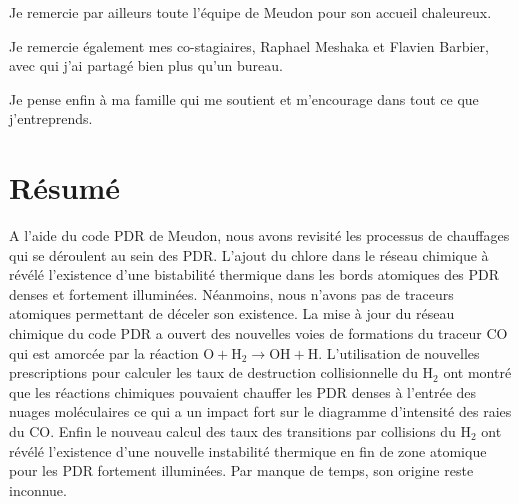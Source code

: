 \documentclass[11pt,a4paper,twoside,openright]{article}
\begin{document}
\begin{spacing}{0.98}
Je remercie par ailleurs toute l’équipe de Meudon pour son accueil chaleureux.\newline

Je remercie également mes co-stagiaires, Raphael Meshaka et Flavien Barbier, avec qui j’ai partagé bien plus qu'un bureau.  \newline

Je pense enfin à ma famille qui me soutient et m’encourage dans tout ce que j’entreprends. 


\newpage 

\clearpage 
\thispagestyle{nofancy}
\section*{Résumé}

A l'aide du code PDR de Meudon, nous avons revisité les processus de chauffages qui se déroulent au sein des PDR. L'ajout du chlore dans le réseau chimique à révélé l'existence d'une bistabilité thermique dans les bords atomiques des PDR denses et fortement illuminées. Néanmoins, nous n'avons pas de traceurs atomiques permettant de déceler son existence. La mise à jour du réseau chimique du code PDR a ouvert des nouvelles voies de formations du traceur $\mathrm{CO}$ qui est amorcée par la réaction  $\mathrm{O} + \mathrm{H}_2 \rightarrow \mathrm{OH} + \mathrm{H}$. L'utilisation de nouvelles prescriptions pour calculer les taux de destruction collisionnelle du $\mathrm{H}_2$ ont montré que les réactions chimiques pouvaient chauffer les PDR denses à l'entrée des nuages moléculaires ce qui a un impact fort sur le diagramme d'intensité des raies du $\mathrm{CO}$. Enfin le nouveau calcul des taux des transitions par collisions du $\mathrm{H}_2$ ont révélé l'existence d'une nouvelle instabilité thermique en fin de zone atomique pour les PDR fortement illuminées. Par manque de temps, son origine reste inconnue.


\clearpage 
\setcounter{secnumdepth}{4}
\thispagestyle{nofancy}
\tableofcontents

\setcounter{figure}{0}    

\newpage




\end{spacing}
\end{document}
